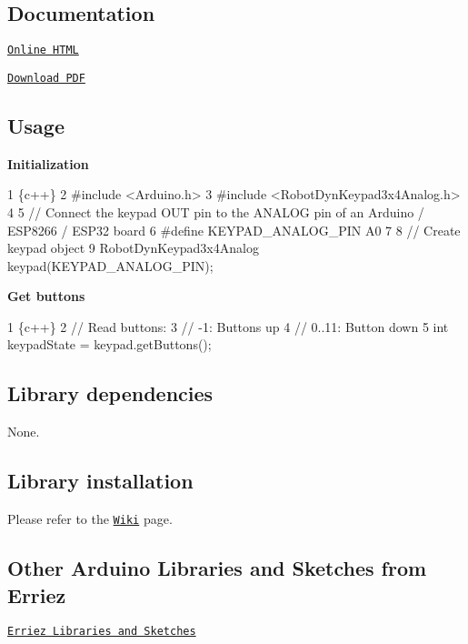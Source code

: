 \subsection*{Documentation}


\begin{DoxyItemize}
\item \href{https://Erriez.github.io/ErriezRobotDynKeypad3x4Analog}{\tt Online H\+T\+ML}
\item \href{https://github.com/Erriez/ErriezRobotDynKeypad3x4Analog/raw/gh-pages/latex/ErriezRobotDynKeypad3x4Analog.pdf}{\tt Download P\+DF}
\end{DoxyItemize}

\subsection*{Usage}

{\bfseries Initialization}


\begin{DoxyCode}
1 \{c++\}
2 #include <Arduino.h>
3 #include <RobotDynKeypad3x4Analog.h>
4 
5 // Connect the keypad OUT pin to the ANALOG pin of an Arduino / ESP8266 / ESP32 board
6 #define KEYPAD\_ANALOG\_PIN   A0
7 
8 // Create keypad object
9 RobotDynKeypad3x4Analog keypad(KEYPAD\_ANALOG\_PIN);
\end{DoxyCode}


{\bfseries Get buttons}


\begin{DoxyCode}
1 \{c++\}
2 // Read buttons:
3 // -1:    Buttons up
4 // 0..11: Button down
5 int keypadState = keypad.getButtons();
\end{DoxyCode}


\subsection*{Library dependencies}


\begin{DoxyItemize}
\item None.
\end{DoxyItemize}

\subsection*{Library installation}

Please refer to the \href{https://github.com/Erriez/ErriezArduinoLibrariesAndSketches/wiki}{\tt Wiki} page.

\subsection*{Other Arduino Libraries and Sketches from Erriez}


\begin{DoxyItemize}
\item \href{https://github.com/Erriez/ErriezArduinoLibrariesAndSketches}{\tt Erriez Libraries and Sketches} 
\end{DoxyItemize}